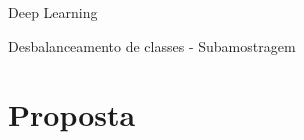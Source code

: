 \documentclass{beamer}
\begin{document}
\begin{frame}{Deep Learning}
\begin{frame}{Desbalanceamento de classes - Subamostragem}
\end{frame}
\section{Proposta}

\end{frame}
\end{document}
